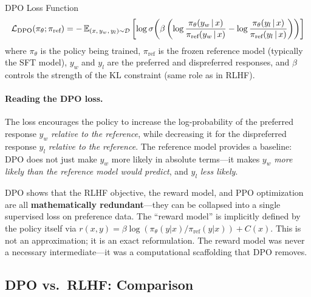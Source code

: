 \begin{mathresult}{DPO Loss Function}
\begin{equation}
\mathcal{L}_{\text{DPO}}(\pi_\theta; \pi_{\text{ref}})
= -\operatorname{\mathbb{E}}_{(x,\, y_w,\, y_l) \sim \mathcal{D}}
\left[\log \sigma\!\left(
  \beta \left(
    \log \frac{\pi_\theta(y_w \,|\, x)}{\pi_{\text{ref}}(y_w \,|\, x)}
    - \log \frac{\pi_\theta(y_l \,|\, x)}{\pi_{\text{ref}}(y_l \,|\, x)}
  \right)
\right)\right]
\label{eq:dpo_loss}
\end{equation}
where $\pi_\theta$ is the policy being trained, $\pi_{\text{ref}}$ is the
frozen reference model (typically the SFT model), $y_w$ and $y_l$ are the
preferred and dispreferred responses, and $\beta$ controls the strength
of the KL constraint (same role as in RLHF).
\end{mathresult}

\paragraph{Reading the DPO loss.}
The loss encourages the policy to increase the log-probability of the
preferred response $y_w$ \emph{relative to the reference}, while
decreasing it for the dispreferred response $y_l$ \emph{relative to the
reference}.  The reference model provides a baseline: DPO does not just
make $y_w$ more likely in absolute terms---it makes $y_w$ \emph{more
likely than the reference model would predict}, and $y_l$ \emph{less
likely}.

\begin{keyinsight}
DPO shows that the RLHF objective, the reward model, and PPO optimization
are all \textbf{mathematically redundant}---they can be collapsed into a
single supervised loss on preference data.  The ``reward model'' is
implicitly defined by the policy itself via
$r(x, y) = \beta \log(\pi_\theta(y|x) / \pi_{\text{ref}}(y|x)) + C(x)$.
This is not an approximation; it is an exact reformulation.  The reward
model was never a necessary intermediate---it was a computational
scaffolding that DPO removes.
\end{keyinsight}

\subsection{DPO vs.\ RLHF: Comparison}

